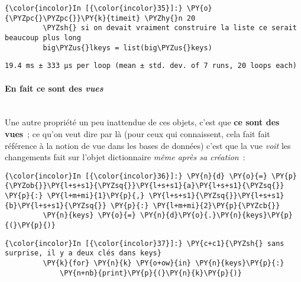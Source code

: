     \begin{Verbatim}[commandchars=\\\{\}]
{\color{incolor}In [{\color{incolor}35}]:} \PY{o}{\PYZpc{}\PYZpc{}}\PY{k}{timeit} \PYZhy{}n 20
         \PYZsh{} si on devait vraiment construire la liste ce serait beaucoup plus long
         big\PYZus{}lkeys = list(big\PYZus{}keys)
\end{Verbatim}


    \begin{Verbatim}[commandchars=\\\{\}]
19.4 ms ± 333 µs per loop (mean ± std. dev. of 7 runs, 20 loops each)

    \end{Verbatim}

    \hypertarget{en-fait-ce-sont-des-vues}{%
\paragraph{\texorpdfstring{En fait ce sont des
\emph{vues}}{En fait ce sont des vues}\\\\}\label{en-fait-ce-sont-des-vues}}

    Une autre propriété un peu inattendue de ces objets, c'est que
\textbf{ce sont des vues}~; ce qu'on veut dire par là (pour ceux qui
connaissent, cela fait fait référence à la notion de vue dans les bases
de données) c'est que la vue \emph{voit} les changements fait sur
l'objet dictionnaire \emph{même après sa création}~:

    \begin{Verbatim}[commandchars=\\\{\}]
{\color{incolor}In [{\color{incolor}36}]:} \PY{n}{d} \PY{o}{=} \PY{p}{\PYZob{}}\PY{l+s+s1}{\PYZsq{}}\PY{l+s+s1}{a}\PY{l+s+s1}{\PYZsq{}} \PY{p}{:} \PY{l+m+mi}{1}\PY{p}{,} \PY{l+s+s1}{\PYZsq{}}\PY{l+s+s1}{b}\PY{l+s+s1}{\PYZsq{}} \PY{p}{:} \PY{l+m+mi}{2}\PY{p}{\PYZcb{}}
         \PY{n}{keys} \PY{o}{=} \PY{n}{d}\PY{o}{.}\PY{n}{keys}\PY{p}{(}\PY{p}{)}
\end{Verbatim}


    \begin{Verbatim}[commandchars=\\\{\}]
{\color{incolor}In [{\color{incolor}37}]:} \PY{c+c1}{\PYZsh{} sans surprise, il y a deux clés dans keys}
         \PY{k}{for} \PY{n}{k} \PY{o+ow}{in} \PY{n}{keys}\PY{p}{:}
             \PY{n+nb}{print}\PY{p}{(}\PY{n}{k}\PY{p}{)}
\end{Verbatim}


